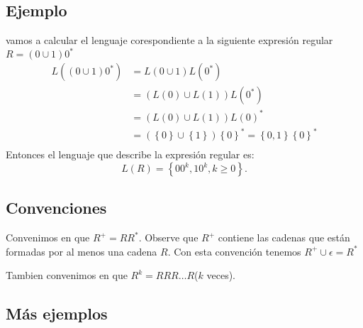\documentclass[a4paper,dvipsnames]{book}
\begin{document}
\subsection{Ejemplo}

vamos a calcular el {\color{MidnightBlue} lenguaje corespondiente a la siguiente expresión regular \(R=\left(0\cup 1\right)0^{*}\)}
\begin{align*}
    L\left(\left(0\cup 1\right)0^{*}\right) &= L\left(0\cup 1\right)L\left(0^{*}\right) \\
    &= \left(L\left(0\right) \cup L\left(1\right)\right)L\left(0^{*}\right)  \\
    &= \left(L\left(0\right)\cup L\left(1\right)\right)L\left(0\right)^{*} \\
    &= \left(\left\{0\right\} \cup \left\{1\right\}\right)\left\{0\right\}^{*} = \left\{0,1\right\}\left\{0\right\}^{*}\\
\end{align*}
Entonces el lenguaje que describe la expresión regular es:
\[ L\left(R\right)=\left\{00^{k},10^{k},k\ge 0\right\}.\]

\subsection{Convenciones}
\label{ssec:convenciones}

Convenimos en que \(R^{+}=RR^{*}\). Observe que \(R^{+}\) contiene las cadenas que están formadas por al menos una cadena \(R\). Con esta convención tenemos \(R^{+}\cup \epsilon =R^{*}\)

Tambien convenimos en que \(R^{k}=R R R\ldots R\)(\(k\) veces).

\subsection{Más ejemplos}

\end{document}
